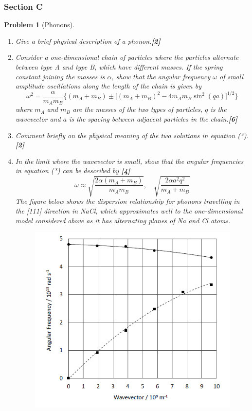 \documentclass[a4paper]{article}
\theoremstyle{new}
\newtheorem{qns}{Problem}[subsection]
\begin{document}
\subsubsection{Section C}
\begin{qns}[Phonons]\leavevmode
\begin{enumerate}[label=(\roman*)]
\item Give a brief physical description of a phonon.\hfill\textbf{[2]}
\item Consider a one-dimensional chain of particles where the particles alternate between type A and type B, which have different masses. If the spring constant joining the masses is $\alpha$, show that the angular frequency $\omega$ of small amplitude oscillations along the length of the chain is given by 
\begin{equation}
\omega^2=\frac{\alpha}{m_Am_B}\bigg\{(m_A+m_B)\pm\bigg[(m_A+m_B)^2-4m_Am_B\sin^2(qa)\bigg]^{1/2}\bigg\}\tag{*}
\end{equation}
where $m_A$ and $m_B$ are the masses of the two types of particles, $q$ is the wavevector and $a$ is the spacing between adjacent particles in the chain.\hfill\textbf{[6]}
\item Comment briefly on the physical meaning of the two solutions in equation (*).\hfill\textbf{[2]}
\item In the limit where the wavevector is small, show that the angular frequencies in equation (*) can be described by \hfill\textbf{[4]}
$$\omega\approx\sqrt{\frac{2\alpha(m_A+m_B)}{m_Am_B}},\quad \sqrt{\frac{2\alpha a^2q^2}{m_A+m_B}}$$
The figure below shows the dispersion relationship for phonons travelling in the [111] direction in NaCl, which approximates well to the one-dimensional model considered above as it has alternating planes of Na and Cl atoms.
\begin{figure}[H]
    \centering
    \includegraphics[scale=0.85]{2017P2C10Q.PNG}

\end{figure}
\end{enumerate}
\end{qns}
\end{document}
